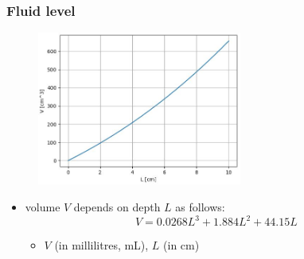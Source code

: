 \documentclass[english,14pt]{beamer}
\begin{document}

\begin{frame}[fragile]

\frametitle{Fluid level}

\vspace*{-4mm}
\begin{figure}[ht]
	\centering
	\includegraphics[width=0.6\textwidth]{figures/fluidVvsL}
\end{figure}
\vspace*{-4mm}
\begin{itemize}
	\item volume $V$ depends on depth $L$ as follows: %
	\[
		V = 0.0268L^3 + 1.884L^2 + 44.15L
	\]
	\vspace*{-4mm}
	\begin{itemize}
		\item $V$ (in millilitres, mL),  $L$ (in cm) 
	\end{itemize}
\end{itemize}
	
\end{frame}

\end{document}
